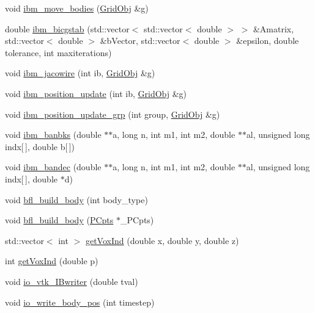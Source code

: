 \begin{DoxyCompactItemize}
\item 
void \hyperlink{class_object_manager_aef4cfcea354469472c0b25bf74757f2b}{ibm\+\_\+move\+\_\+bodies} (\hyperlink{class_grid_obj}{Grid\+Obj} \&g)
\item 
double \hyperlink{class_object_manager_adad4317bfbe5bae833c4ffa3e4538d92}{ibm\+\_\+bicgstab} (std\+::vector$<$ std\+::vector$<$ double $>$ $>$ \&Amatrix, std\+::vector$<$ double $>$ \&b\+Vector, std\+::vector$<$ double $>$ \&epsilon, double tolerance, int maxiterations)
\item 
void \hyperlink{class_object_manager_ae1d5e39f3a837adfc88c4c7ed722c895}{ibm\+\_\+jacowire} (int ib, \hyperlink{class_grid_obj}{Grid\+Obj} \&g)
\item 
void \hyperlink{class_object_manager_a07a4a328974705e440dd303c5c2e0472}{ibm\+\_\+position\+\_\+update} (int ib, \hyperlink{class_grid_obj}{Grid\+Obj} \&g)
\item 
void \hyperlink{class_object_manager_ae9a0efc0b1d088f90b3b16833f948f12}{ibm\+\_\+position\+\_\+update\+\_\+grp} (int group, \hyperlink{class_grid_obj}{Grid\+Obj} \&g)
\item 
void \hyperlink{class_object_manager_a7bf970976700f9949bb08d8dc7f8e637}{ibm\+\_\+banbks} (double $\ast$$\ast$a, long n, int m1, int m2, double $\ast$$\ast$al, unsigned long indx\mbox{[}$\,$\mbox{]}, double b\mbox{[}$\,$\mbox{]})
\item 
void \hyperlink{class_object_manager_a77eb5ec758b5956e0a609fa1fba2f8e8}{ibm\+\_\+bandec} (double $\ast$$\ast$a, long n, int m1, int m2, double $\ast$$\ast$al, unsigned long indx\mbox{[}$\,$\mbox{]}, double $\ast$d)
\item 
void \hyperlink{class_object_manager_a099a446ac7f045d11d6be6babd0a31ab}{bfl\+\_\+build\+\_\+body} (int body\+\_\+type)
\item 
void \hyperlink{class_object_manager_a56c65bd5122aa7e7026fb8d2315482f3}{bfl\+\_\+build\+\_\+body} (\hyperlink{class_p_cpts}{P\+Cpts} $\ast$\+\_\+\+P\+Cpts)
\item 
std\+::vector$<$ int $>$ \hyperlink{class_object_manager_a68230ad49b979c2fe963cb3632a60c3a}{get\+Vox\+Ind} (double x, double y, double z)
\item 
int \hyperlink{class_object_manager_a8e8e70f60dfb9d35d2e320c7c2b3b33c}{get\+Vox\+Ind} (double p)
\item 
void \hyperlink{class_object_manager_a39aa351c7b338473be4871111da5c5bd}{io\+\_\+vtk\+\_\+\+I\+Bwriter} (double tval)
\item 
void \hyperlink{class_object_manager_a1f9a40c58bdb3bd9797f7c44864835ec}{io\+\_\+write\+\_\+body\+\_\+pos} (int timestep)

\end{DoxyCompactItemize}
